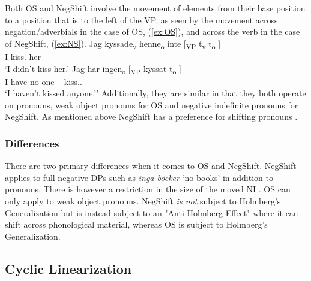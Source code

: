 \documentclass[12pt, letterpaper]{article}
\begin{document}
\ea Both OS and NegShift involve the movement of elements from their base position to a position that is to the left of the VP, as seen by the movement across negation/adverbials in the case of OS, (\ref{ex:OS}), and across the verb in the case of NegShift, (\ref{ex:NS}).
	\ea \label{ex:OS} 
	\gll Jag kyssade\textsubscript{v} henne\textsubscript{o} inte [\textsubscript{VP} t\textsubscript{v} t\textsubscript{o} ] \\
	I kiss.\Pst{} her \Neg{}\\
	\glt `I didn't kiss her.'
	\ex \label{ex:NS}
	\gll Jag har ingen\textsubscript{o} [\textsubscript{VP} kyssat t\textsubscript{o} ]\\
	I have no-one ~ kiss.\Pst{}.\Ptcp{} \\
	\glt `I haven't kissed anyone.''
	\z 
\ex Additionally, they are similar in that they both operate on pronouns, weak object pronouns for OS and negative indefinite pronouns for NegShift.
\ex As mentioned above NegShift has a preference for shifting pronouns \citep{christensenInterfacesNegationSyntax2005,penkaNegativeIndefinites2011}.
\z 

\subsubsection{Differences} \label{sec:DIF}

\ea There are two primary differences when it comes to OS and NegShift.
	\ea NegShift applies to full negative DPs such as \textit{inga böcker} `no books' in addition to pronouns. There is however a restriction in the size of the moved NI \citep{christensenInterfacesNegationSyntax2005,penkaNegativeIndefinites2011}. OS can only apply to weak object pronouns.
	\ex NegShift \emph{is not} subject to Holmberg's Generalization but is instead subject to an "Anti-Holmberg Effect" where it can shift across phonological material, whereas OS is subject to Holmberg's Generalization. 
	\z 
\z

\subsection{Cyclic Linearization} \label{sec:CL}
\end{document}
